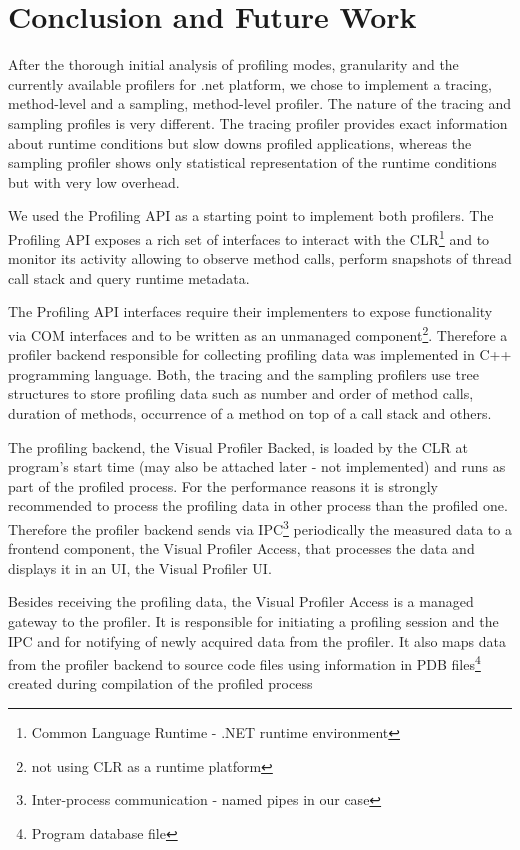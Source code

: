 \chapter{Conclusion and Future Work}

After the thorough initial analysis of profiling modes, granularity and the currently available profilers for .net platform, we chose to implement a tracing, method-level and a sampling, method-level profiler. The nature of the tracing and sampling profiles is very different. The tracing profiler provides exact information about runtime conditions but slow downs profiled applications, whereas the sampling profiler shows only statistical representation of the runtime conditions but with very low overhead.

We used the Profiling API as a starting point to implement both profilers. The Profiling API exposes a rich set of interfaces to interact with the CLR\footnote{Common Language Runtime - .NET runtime environment} and to monitor its activity allowing to observe method calls, perform snapshots of thread call stack and query runtime metadata.

The Profiling API interfaces require their implementers to expose functionality via COM interfaces and to be written as an unmanaged component\footnote{not using CLR as a runtime platform}. Therefore a profiler backend responsible for collecting profiling data was implemented in C++ programming language. Both, the tracing and the sampling profilers use tree structures to store profiling data such as number and order of method calls, duration of methods, occurrence of a method on top of a call stack and others.

The profiling backend, the Visual Profiler Backed, is loaded by the CLR at program's start time (may also be attached later - not implemented) and runs as part of the profiled process. For the performance reasons it is strongly recommended to process the profiling data in other process than the profiled one. Therefore the profiler backend sends via IPC\footnote{Inter-process communication - named pipes in our case} periodically the measured data to a frontend component, the Visual Profiler Access, that processes the data and displays it in an UI, the Visual Profiler UI. 

Besides receiving the profiling data, the Visual Profiler Access is a managed gateway to the profiler. It is responsible for initiating a profiling session and the IPC and for notifying of newly acquired data from the profiler. It also maps data from the profiler backend to source code files using information in PDB files\footnote{Program database file} created during compilation of the profiled process

